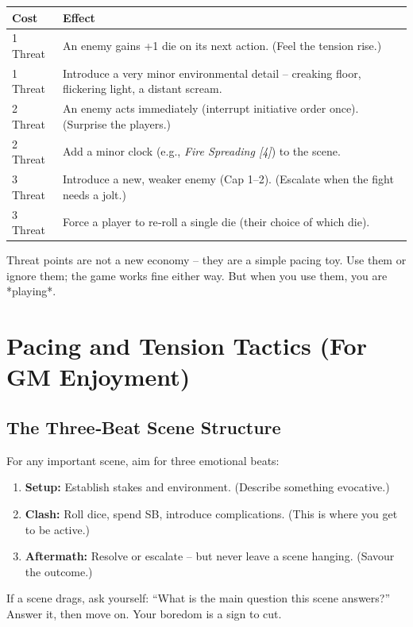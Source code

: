 \begin{fatebox}
\begin{tabularx}{\textwidth}{lX}
\toprule
\textbf{Cost} & \textbf{Effect} \\
\midrule
1 Threat & An enemy gains +1 die on its next action. (Feel the tension rise.) \\
1 Threat & Introduce a very minor environmental detail – creaking floor, flickering light, a distant scream. \\
2 Threat & An enemy acts immediately (interrupt initiative order once). (Surprise the players.) \\
2 Threat & Add a minor clock (e.g., \textit{Fire Spreading [4]}) to the scene. \\
3 Threat & Introduce a new, weaker enemy (Cap 1–2). (Escalate when the fight needs a jolt.) \\
3 Threat & Force a player to re‑roll a single die (their choice of which die). \\
\bottomrule
\end{tabularx}
\end{fatebox}

Threat points are not a new economy – they are a simple pacing toy. Use them or ignore them; the game works fine either way. But when you use them, you are *playing*.

\section{Pacing and Tension Tactics (For GM Enjoyment)}

\subsection*{The Three‑Beat Scene Structure}
For any important scene, aim for three emotional beats:
\begin{enumerate}
  \item \textbf{Setup:} Establish stakes and environment. (Describe something evocative.)
  \item \textbf{Clash:} Roll dice, spend SB, introduce complications. (This is where you get to be active.)
  \item \textbf{Aftermath:} Resolve or escalate – but never leave a scene hanging. (Savour the outcome.)
\end{enumerate}
If a scene drags, ask yourself: “What is the main question this scene answers?” Answer it, then move on. Your boredom is a sign to cut.

